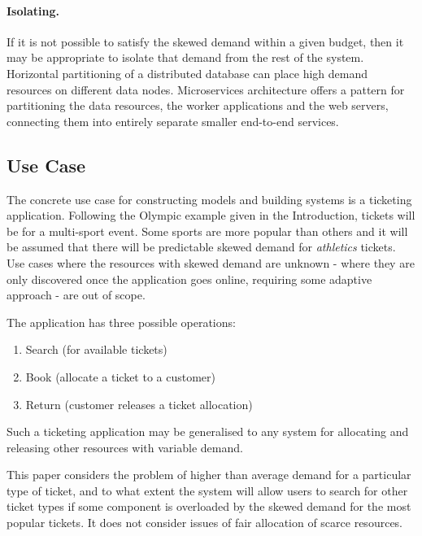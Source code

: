 \documentclass[runningheads]{llncs}
\begin{document}
\paragraph{Isolating.} If it is not possible to satisfy the skewed demand within a given budget, then it may be appropriate to isolate that demand from the rest of the system.  Horizontal partitioning of a distributed database can place high demand resources on different data nodes.  Microservices architecture offers a pattern for partitioning the data resources, the worker applications and the web servers, connecting them into entirely separate smaller end-to-end services.

\subsection{Use Case}

The concrete use case for constructing models and building systems is a ticketing application.  Following the Olympic example given in the Introduction, tickets will be for a multi-sport event.  Some sports are more popular than others and it will be assumed that there will be predictable skewed demand for {\itshape athletics} tickets.  Use cases where the resources with skewed demand are unknown - where they are only discovered once the application goes online, requiring some adaptive approach - are out of scope.

The application has three possible operations:
\begin{enumerate}
\item Search (for available tickets)
\item Book (allocate a ticket to a customer)
\item Return (customer releases a ticket allocation)
\end{enumerate}

Such a ticketing application may be generalised to any system for allocating and releasing other resources with variable demand.

This paper considers the problem of higher than average demand for a particular type of ticket, and to what extent the system will allow users to search for other ticket types if some component is overloaded by the skewed demand for the most popular tickets.  It does not consider issues of fair allocation of scarce resources.

%
%


\end{document}
